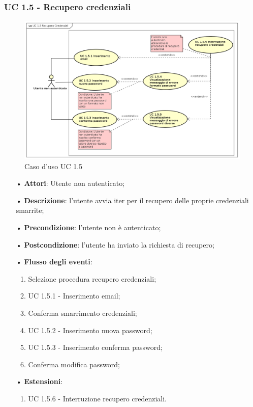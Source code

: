 \subsubsection{UC 1.5 - Recupero credenziali}
\begin{figure}[H]
	\centering
	\includegraphics[width=14cm, keepaspectratio]{img/UC15.png} 
	\caption{Caso d'uso UC 1.5}\label{fig:15}
\end{figure}
\begin{itemize}
	\item[•]\textbf{Attori}: Utente non autenticato;
	\item[•]\textbf{Descrizione}: l’utente avvia iter per il recupero delle proprie credenziali smarrite;
	\item[•]\textbf{Precondizione}: l’utente non è autenticato;
	\item[•]\textbf{Postcondizione}: l’utente ha inviato la richiesta di recupero;
	\item[•]\textbf{Flusso degli eventi}:
	\begin{enumerate}
	\item Selezione procedura recupero credenziali;
	\item UC 1.5.1 - Inserimento email;
	\item Conferma smarrimento credenziali;
	\item UC 1.5.2 - Inserimento nuova password;
	\item UC 1.5.3 - Inserimento conferma password;
	\item Conferma modifica password;
	\end{enumerate}
	\item[•]\textbf{Estensioni}:
	\begin{enumerate}
		\item UC 1.5.6 - Interruzione recupero credenziali.
	\end{enumerate}
\end{itemize}

